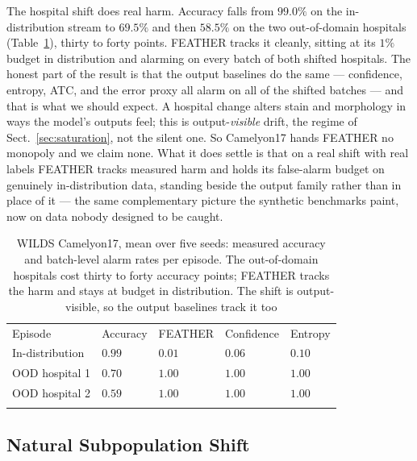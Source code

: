 \documentclass[graybox]{SNmult}
\begin{document}
The hospital shift does real harm. Accuracy falls from $99.0\%$ on the
in-distribution stream to $69.5\%$ and then $58.5\%$ on the two out-of-domain
hospitals (Table~\ref{tab:wilds}), thirty to forty points. FEATHER tracks it
cleanly, sitting at its $1\%$ budget in distribution and alarming on every
batch of both shifted hospitals. The honest part of the result is that the
output baselines do the same --- confidence, entropy, ATC, and the error proxy
all alarm on all of the shifted batches --- and that is what we should expect.
A hospital change alters stain and morphology in ways the model's outputs
feel; this is output-\emph{visible} drift, the regime of
Sect.~\ref{sec:saturation}, not the silent one. So Camelyon17 hands FEATHER no
monopoly and we claim none. What it does settle is that on a real shift with
real labels FEATHER tracks measured harm and holds its false-alarm budget on
genuinely in-distribution data, standing beside the output family rather than
in place of it --- the same complementary picture the synthetic benchmarks
paint, now on data nobody designed to be caught.

\begin{table}[!t]
\caption{WILDS Camelyon17, mean over five seeds: measured accuracy and
batch-level alarm rates per episode. The out-of-domain hospitals cost thirty
to forty accuracy points; FEATHER tracks the harm and stays at budget in
distribution. The shift is output-visible, so the output baselines track it
too}
\label{tab:wilds}
\begin{tabular}{p{3.4cm}p{1.7cm}p{1.7cm}p{1.7cm}p{1.7cm}}
\hline\noalign{\smallskip}
Episode & Accuracy & FEATHER & Confidence & Entropy \\
\noalign{\smallskip}\svhline\noalign{\smallskip}
In-distribution & $0.99$ & $0.01$ & $0.06$ & $0.10$ \\
OOD hospital 1 & $0.70$ & $1.00$ & $1.00$ & $1.00$ \\
OOD hospital 2 & $0.59$ & $1.00$ & $1.00$ & $1.00$ \\
\noalign{\smallskip}\hline\noalign{\smallskip}
\end{tabular}
\end{table}

\subsection{Natural Subpopulation Shift}
\label{sec:breeds}
\end{document}
